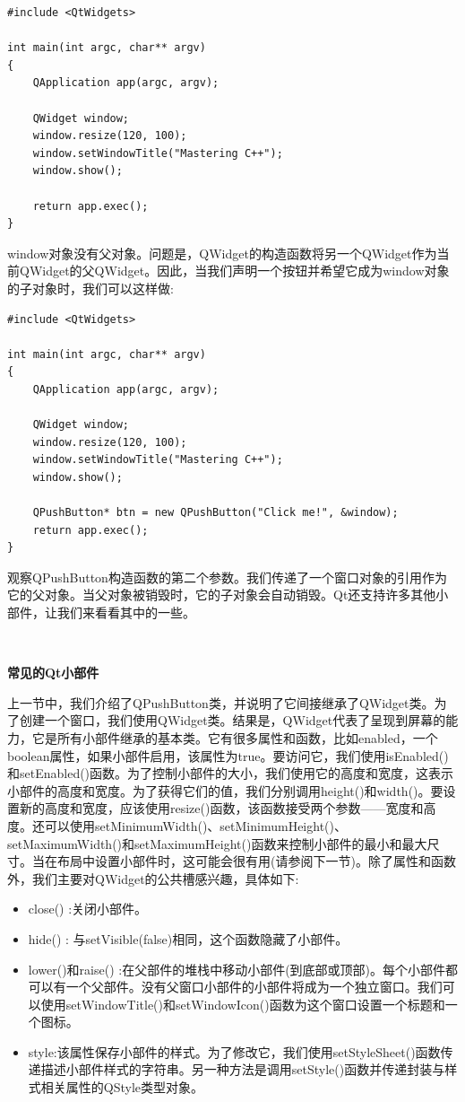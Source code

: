 \begin{lstlisting}[caption={}]
#include <QtWidgets>

int main(int argc, char** argv)
{
	QApplication app(argc, argv);
	
	QWidget window;
	window.resize(120, 100);
	window.setWindowTitle("Mastering C++");
	window.show();
	
	return app.exec();
}
\end{lstlisting}

window对象没有父对象。问题是，QWidget的构造函数将另一个QWidget作为当前QWidget的父QWidget。因此，当我们声明一个按钮并希望它成为window对象的子对象时，我们可以这样做: \par

\begin{lstlisting}[caption={}]
#include <QtWidgets>

int main(int argc, char** argv)
{
	QApplication app(argc, argv);
	
	QWidget window;
	window.resize(120, 100);
	window.setWindowTitle("Mastering C++");
	window.show();
	
	QPushButton* btn = new QPushButton("Click me!", &window);
	return app.exec();
}
\end{lstlisting}

观察QPushButton构造函数的第二个参数。我们传递了一个窗口对象的引用作为它的父对象。当父对象被销毁时，它的子对象会自动销毁。Qt还支持许多其他小部件，让我们来看看其中的一些。 \par

\noindent\textbf{}\ \par
\textbf{常见的Qt小部件} \ \par
上一节中，我们介绍了QPushButton类，并说明了它间接继承了QWidget类。为了创建一个窗口，我们使用QWidget类。结果是，QWidget代表了呈现到屏幕的能力，它是所有小部件继承的基本类。它有很多属性和函数，比如enabled，一个boolean属性，如果小部件启用，该属性为true。要访问它，我们使用isEnabled()和setEnabled()函数。为了控制小部件的大小，我们使用它的高度和宽度，这表示小部件的高度和宽度。为了获得它们的值，我们分别调用height()和width()。要设置新的高度和宽度，应该使用resize()函数，该函数接受两个参数——宽度和高度。还可以使用setMinimumWidth()、setMinimumHeight()、setMaximumWidth()和setMaximumHeight()函数来控制小部件的最小和最大尺寸。当在布局中设置小部件时，这可能会很有用(请参阅下一节)。除了属性和函数外，我们主要对QWidget的公共槽感兴趣，具体如下: \par

\begin{itemize}
	\item close() :关闭小部件。
	\item hide() : 与setVisible(false)相同，这个函数隐藏了小部件。
	\item lower()和raise() :在父部件的堆栈中移动小部件(到底部或顶部)。每个小部件都可以有一个父部件。没有父窗口小部件的小部件将成为一个独立窗口。我们可以使用setWindowTitle()和setWindowIcon()函数为这个窗口设置一个标题和一个图标。
	\item style:该属性保存小部件的样式。为了修改它，我们使用setStyleSheet()函数传递描述小部件样式的字符串。另一种方法是调用setStyle()函数并传递封装与样式相关属性的QStyle类型对象。
\end{itemize}

